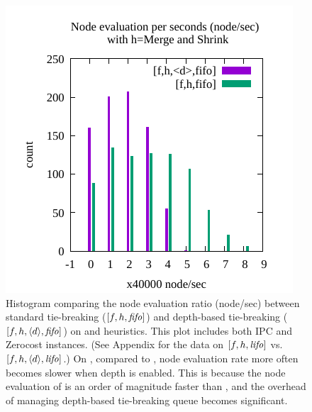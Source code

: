 \begin{figure}[htbp]
 \includegraphics{img/node-sec/mnhiF-mnh_F-hist.pdf}
 \caption{Histogram comparing the node evaluation ratio (node/sec) between standard tie-breaking ($[f,h,{\text{\textit{fifo}}}]$) and
 depth-based tie-breaking ($[f,h,{\left<d\right>},{\text{\textit{fifo}}}]$) on \lmcut and \mands heuristics.
 This plot includes both IPC and Zerocost instances.
 (See Appendix  for the data on $[f,h,{\text{\textit{lifo}}}]$ vs. $[f,h,{\left<d\right>},{\text{\textit{lifo}}}]$.)
 On \mands, compared to \lmcut, node evaluation rate more often becomes
 slower when depth is enabled. This is because the node evaluation of \mands is an order of
 magnitude faster than \lmcut, and the overhead of managing depth-based tie-breaking queue becomes significant.
 }
 \label{fig:expansion-ratio}
\end{figure}


